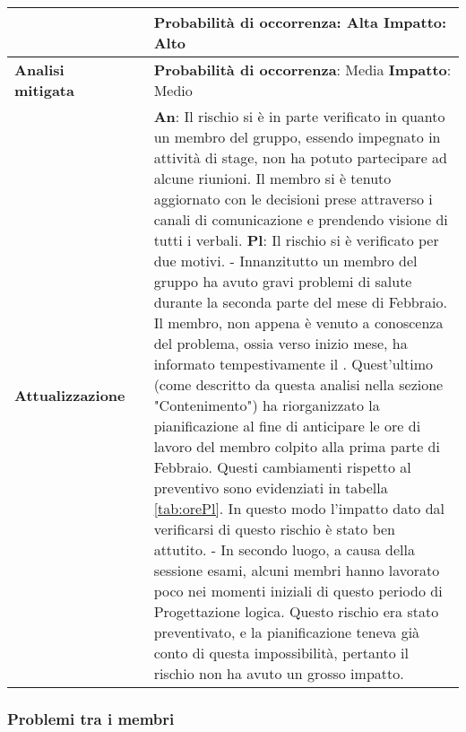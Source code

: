 \begin{table}[H]
\begin{center}
{\begin{tabular}{p{2.5cm}p{0.5cm}p{11cm}}
						& &
						\textbf{Probabilità di occorrenza}: Alta
						\newline
						\textbf{Impatto}: Alto
					\\
					\midrule
						\textbf{Analisi \newline mitigata}
						& &
						\textbf{Probabilità di occorrenza}: Media
						\newline
						\textbf{Impatto}: Medio
					\\
					\midrule
						\textbf{Attualizzazione}
						& &
						\textbf{An}: Il rischio si è in parte verificato in quanto un membro del gruppo, essendo impegnato in attività di stage, non ha potuto partecipare ad alcune riunioni. Il membro si è tenuto aggiornato con le decisioni prese attraverso i canali di comunicazione e prendendo visione di tutti i verbali.
						\newline
						\textbf{Pl}: Il rischio si è verificato per due motivi.
						- Innanzitutto un membro del gruppo ha avuto gravi problemi di salute durante la seconda parte del mese di Febbraio. Il membro, non appena è venuto a conoscenza del problema, ossia verso inizio mese, ha informato tempestivamente il \responsabile. Quest'ultimo (come descritto da questa analisi nella sezione "Contenimento") ha riorganizzato la pianificazione al fine di anticipare le ore di lavoro del membro colpito alla prima parte di Febbraio. Questi cambiamenti 
						rispetto al preventivo sono evidenziati in tabella \ref{tab:orePl}. In questo modo l'impatto dato dal verificarsi di questo rischio è stato ben attutito.
						- In secondo luogo, a causa della sessione esami, alcuni membri hanno lavorato poco nei momenti iniziali di questo periodo di Progettazione logica. Questo rischio era stato preventivato, e la pianificazione teneva già conto di questa impossibilità, pertanto il rischio non ha avuto un grosso impatto.
					\\
					
					\bottomrule	
					\end{tabular}}
					\end{center}
					\end{table}			
				\newpage

		\subsubsection {Problemi tra i membri}
		\label{subsec:pbmTraMembri}
		
